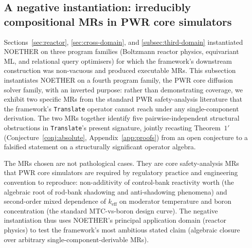 \documentclass[acmsmall,screen,review]{acmart}
\begin{document}
\subsection{A negative instantiation: irreducibly compositional MRs in PWR core simulators}
\label{subsec:negative-pwr}

Sections~\ref{sec:reactor}, \ref{sec:cross-domain}, and \ref{subsec:third-domain} instantiated NOETHER on three program families (Boltzmann reactor physics, equivariant ML, and relational query optimisers) for which the framework's downstream construction was non-vacuous and produced executable MRs. This subsection instantiates NOETHER on a fourth program family, the PWR core diffusion solver family, with an inverted purpose: rather than demonstrating coverage, we exhibit two specific MRs from the standard PWR safety-analysis literature that the framework's \texttt{Translate} operator cannot reach under any single-component derivation. The two MRs together identify five pairwise-independent structural obstructions in \texttt{Translate}'s present signature, jointly recasting Theorem~$1'$ (Conjecture~\ref{conj:absolute}, Appendix~\ref{app:proofs}) from an open conjecture to a falsified statement on a structurally significant operator algebra.

The MRs chosen are not pathological cases. They are core safety-analysis MRs that PWR core simulators are required by regulatory practice and engineering convention to reproduce: non-additivity of control-bank reactivity worth (the algebraic root of rod-bank shadowing and anti-shadowing phenomena) and second-order mixed dependence of $k_{\mathrm{eff}}$ on moderator temperature and boron concentration (the standard MTC-vs-boron design curve). The negative instantiation thus uses NOETHER's principal application domain (reactor physics) to test the framework's most ambitious stated claim (algebraic closure over arbitrary single-component-derivable MRs).
\end{document}
